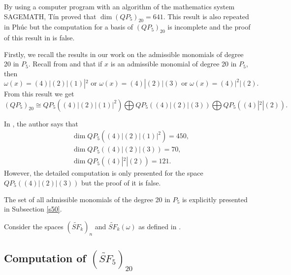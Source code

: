 \documentclass[reqno]{amsart}
\theoremstyle{plain}
\theoremstyle{definition}
\theoremstyle{plain}
\theoremstyle{definition}
\numberwithin{equation}{section}
\begin{document}
By using a computer program with an algorithm of the mathematics system SAGEMATH, T\'in \cite{Tij} proved that $\dim(QP_5)_{20} = 641$. This result is also repeated in Ph\'uc \cite{p24} but the computation for a basis of $(QP_5)_{20}$ is incomplete and the proof of this result in \cite{p24} is false.

Firstly, we recall the results in our work \cite{suz} on the admissible monomials of degree 20 in $P_5$. Recall from \cite{suz} and \cite{p24} that if $x$ is an admissible monomial of degree 20 in $P_5$, then
\begin{equation*}
\omega(x) = (4)|(2)|(1)|^2 \mbox{ or } \omega(x) = (4)|(2)|(3) \mbox{ or } \omega(x) =(4)|^{2}|(2).
\end{equation*}
From this result we get 
$$
(QP_5)_{20}	\cong QP_5((4)|(2)|(1)|^2) \bigoplus QP_5((4)|(2)|(3)) \bigoplus QP_5((4)|^{2}|(2)).
$$

In \cite{p24}, the author says that
\begin{align*}&\dim QP_5((4)|(2)|(1)|^2) = 450,\\ &\dim QP_5((4)|(2)|(3)) = 70,\\ &\dim QP_5((4)|^{2}|(2)) = 121.
\end{align*}
However, the detailed computation is only presented for the space $QP_5((4)|(2)|(3))$ but the proof of it is false. 

The set of all admissible monomials of the degree 20 in $P_5$ is explicitly presented in Subsection \ref{s50}.

Consider the spaces $(\widetilde {SF}_k)_n$ and $\widetilde {SF}_k(\omega)$ as defined in \cite[Page 5]{suw}.

\subsection{Computation of $(\widetilde{SF}_5)_{20}$}\
\end{document}
